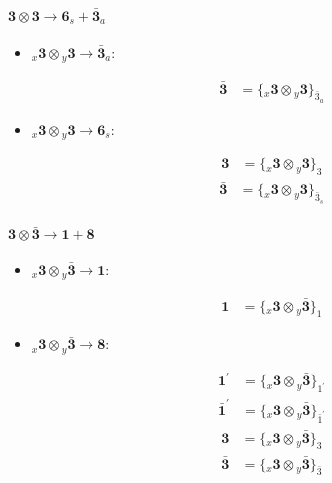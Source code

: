 \documentclass[english]{article}
\newcommand{\cgEqFontsize}{\large}
\newcommand{\rep}[1]{\mathbf{#1}}
\newcommand{\repx}[2]{{}_{#2}\mathbf{#1}}
\newcommand{\tsprod}[2]{\rep{#1}\otimes\rep{#2}}
\newcommand{\tsprodx}[2]{\repx{#1}{x}\otimes\repx{#2}{y}}
\newcommand{\subcgt}[3]{\big\{ \tsprodx{#1}{#2}\big\}^{}_{#3}}
\newcommand{\bfl}{\begin{fleqn}[25pt]}
\newcommand{\efl}{\end{fleqn}}
\begin{document}
\paragraph*{\cgEqFontsize $\tsprod{3}{3}\to\rep{6}_s+\rep{\bar{3}}_a$}
\begin{itemize}
\item $\tsprodx{3}{3}\to\rep{\bar{3}}_{a}$:
\bfl
\begin{align*}
\rep{\bar{3}} & = \subcgt{3}{3}{\bar{3}_{a}}
\end{align*}
\efl
\item $\tsprodx{3}{3}\to\rep{6}_{s}$:
\bfl
\begin{align*}
\rep{3} & = \subcgt{3}{3}{3}
\end{align*}
\begin{align*}
\rep{\bar{3}} & = \subcgt{3}{3}{\bar{3}_{s}}
\end{align*}
\efl
\end{itemize}
\paragraph*{\cgEqFontsize $\tsprod{3}{\bar{3}}\to\rep{1}+\rep{8}$}
\begin{itemize}
\item $\tsprodx{3}{\bar{3}}\to\rep{1}$:
\bfl
\begin{align*}
\rep{1} & = \subcgt{3}{\bar{3}}{1}
\end{align*}
\efl
\item $\tsprodx{3}{\bar{3}}\to\rep{8}$:
\bfl
\begin{align*}
\rep{1^{\prime}} & = \subcgt{3}{\bar{3}}{1^{\prime}}
\end{align*}
\begin{align*}
\rep{\bar{1}^{\prime}} & = \subcgt{3}{\bar{3}}{\bar{1}^{\prime}}
\end{align*}
\begin{align*}
\rep{3} & = \subcgt{3}{\bar{3}}{3}
\end{align*}
\begin{align*}
\rep{\bar{3}} & = \subcgt{3}{\bar{3}}{\bar{3}}
\end{align*}
\efl
\end{itemize}
\end{document}
